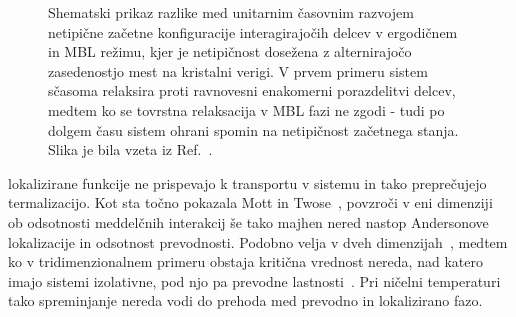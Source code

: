 \documentclass[10pt,a4paper]{article}
\begin{document}
\begin{minipage}[t]{0.55\textwidth}
\begin{figure}[H]
\caption{
Shematski prikaz razlike med unitarnim časovnim razvojem netipične začetne konfiguracije interagirajočih delcev v ergodičnem in MBL režimu, kjer je netipičnost dosežena z alternirajočo zasedenostjo mest na kristalni verigi.
 V prvem primeru sistem sčasoma relaksira proti ravnovesni enakomerni porazdelitvi delcev, medtem ko se tovrstna relaksacija v MBL fazi ne zgodi - tudi po dolgem času sistem ohrani spomin na netipičnost začetnega stanja. Slika je bila vzeta iz Ref.~\cite{abanin2018ergodicity}. 
}
\label{fig:abanin_thermalization}
\end{figure}
\end{minipage}
lokalizirane 
funkcije ne
 prispevajo k transportu v sistemu in tako preprečujejo termalizacijo. Kot sta točno pokazala Mott in Twose~\cite{doi:10.1080/00018736100101271}, povzroči v eni dimenziji ob odsotnosti meddelčnih interakcij še tako majhen nered nastop Andersonove lokalizacije in odsotnost prevodnosti. Podobno velja v dveh dimenzijah~\cite{abrahams1979scaling}, medtem ko v tridimenzionalnem primeru obstaja kritična vrednost nereda, nad katero imajo sistemi izolativne, pod njo pa prevodne lastnosti~\cite{mott1990metal}. Pri ničelni temperaturi tako spreminjanje nereda vodi do prehoda med prevodno in lokalizirano fazo. \\\\
\end{document}
